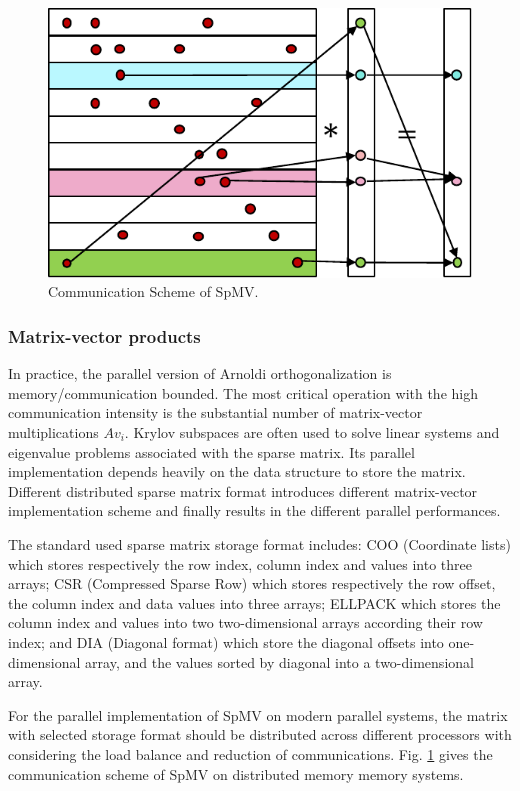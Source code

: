 \begin{figure}[h]
	\centering
	\includegraphics[width=4.8in]{fig/spmv.pdf}
	\caption{Communication Scheme of SpMV.}
	\label{fig:spmv}
\end{figure}

\subsubsection{Matrix-vector products}

In practice, the parallel version of Arnoldi orthogonalization is memory/communication bounded. The most critical operation with the high communication intensity is the substantial number of matrix-vector multiplications $Av_i$. Krylov subspaces are often used to solve linear systems and eigenvalue problems associated with the sparse matrix. Its parallel implementation depends heavily on the data structure to store the matrix. Different distributed sparse matrix format introduces different matrix-vector implementation scheme and finally results in the different parallel performances.

The standard used sparse matrix storage format includes: COO (Coordinate lists) which stores respectively the row index, column index and values into three arrays; CSR (Compressed Sparse Row) which stores respectively the row offset, the column index and data values into three arrays; ELLPACK which stores the column index and values into two two-dimensional arrays according their row index; and DIA (Diagonal format) which store the diagonal offsets into one-dimensional array, and the values sorted by diagonal into a two-dimensional array.

For the parallel implementation of SpMV on modern parallel systems, the matrix with selected storage format should be distributed across different processors with considering the load balance and reduction of communications. Fig. \ref{fig:spmv} gives the communication scheme of SpMV on distributed memory memory systems.

